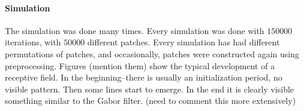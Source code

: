 \paragraph{Simulation}
The simulation was done many times. Every simulation was done with $150000$
iterations, with $50000$ different patches. Every simulation has had different
permutations of patches, and occasionally, patches were constructed again using
preprocessing. Figures (mention them) show the typical development of a
receptive field. In the beginning--there is usually an initialization period, no
visible pattern. Then some lines start to emerge. In the end it is clearly
visible something similar to the Gabor filter. (need to comment this more
extensively)
